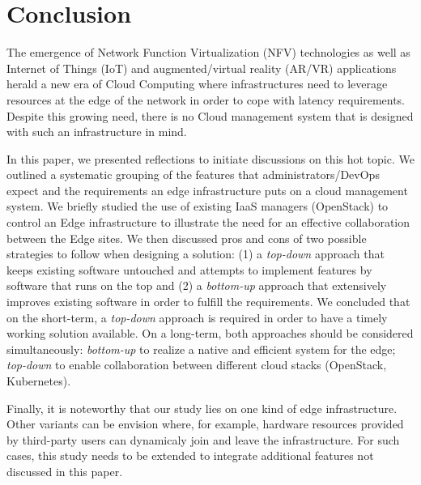 \section{Conclusion}
\label{sec:conclusion}

The emergence of Network Function Virtualization (NFV) technologies as
well as Internet of Things (IoT) and augmented/virtual reality (AR/VR)
applications herald a new era of Cloud Computing where infrastructures
need to leverage resources at the edge of the network in order to cope
with latency requirements.  Despite this growing need, there is no
Cloud management system that is designed with such an infrastructure
in mind.

In this paper, we presented reflections to initiate discussions on this
hot topic. We outlined a systematic grouping of the features that
administrators/DevOps expect and the requirements an edge
infrastructure puts on a cloud management system.
We briefly studied the use of existing IaaS managers (\ie OpenStack)
to control an Edge infrastructure to illustrate the need for an
effective collaboration between the Edge sites.  
We then discussed
pros and cons of two possible strategies to follow when designing a
solution: (1) a \emph{top-down} approach that keeps existing software
untouched and attempts to implement features by software that runs on
the top and (2) a \emph{bottom-up} approach that extensively improves
existing software in order to fulfill the requirements. 
We concluded that on the short-term, a \emph{top-down} approach is required in order to have a timely working solution available. On a long-term, both approaches should be considered simultaneously: \emph{bottom-up} to realize a native and efficient system for the edge; \emph{top-down} to enable collaboration between different cloud stacks (\eg OpenStack, Kubernetes).

Finally, it is noteworthy that our study lies on one kind of edge
infrastructure. Other variants can be envision where, for example,
hardware resources provided by third-party users can dynamicaly join
and leave the infrastructure. For such cases, this study needs to be
extended to integrate additional features not discussed in this paper.

